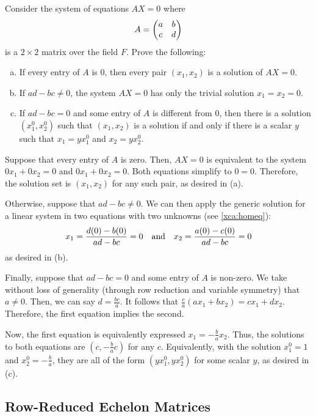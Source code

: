 \begin{xca}
  Consider the system of equations $AX = 0$ where \[ A = \mqty(a&b \\ c&d) \]
  is a $2 \times 2$ matrix over the field $F$. Prove the following:
  \setlength\parskip{0pt}
  \begin{enumerate}[(a)]
    \item If every entry of $A$ is 0, then every pair $(x_1, x_2)$ is a solution of $AX = 0$.
    \item If $ad-bc \neq 0$, the system $AX = 0$ has only the trivial solution $x_1 = x_2 = 0$.
    \item If $ad-bc = 0$ and some entry of $A$ is different from 0,
          then there is a solution $(x_1^0, x_2^0)$ such that
          $(x_1, x_2)$ is a solution if and only if there is a scalar $y$ such that
          $x_1 = yx_1^0$ and $x_2 = yx_2^0$.
  \end{enumerate}
\end{xca}
\begin{prf}
  Suppose that every entry of $A$ is zero.
  Then, $AX = 0$ is equivalent to the system $0x_1 + 0x_2 = 0$ and $0x_1 + 0x_2 = 0$.
  Both equations simplify to $0 = 0$.
  Therefore, the solution set is $(x_1, x_2)$ for any such pair, as desired in (a).

  Otherwise, suppose that $ad - bc \neq 0$.
  We can then apply the generic solution for a linear system in two equations with two unknowns
  (see \cref{xca:homeq}):
  \[ x_1 = \frac{d(0) - b(0)}{ad - bc} = 0 \qq{and} x_2 = \frac{a(0) - c(0)}{ad - bc} = 0 \]
  as desired in (b).

  Finally, suppose that $ad - bc = 0$ and some entry of $A$ is non-zero.
  We take without loss of generality (through row reduction and variable symmetry) that $a \neq 0$.
  Then, we can say $d = \frac{bc}{a}$.
  It follows that $\frac{c}{a}(ax_1 + bx_2) = cx_1 + dx_2$.
  Therefore, the first equation implies the second.

  Now, the first equation is equivalently expressed $x_1 = -\frac{b}{a}x_2$.
  Thus, the solutions to both equations are $(c, -\frac{b}{a}c)$ for any $c$.
  Equivalently, with the solution $x_1^0 = 1$ and $x_2^0 = -\frac{b}{a}$,
  they are all of the form $(yx_1^0, yx_2^0)$ for some scalar $y$, as desired in (c).
\end{prf}

\subsection{Row-Reduced Echelon Matrices}

